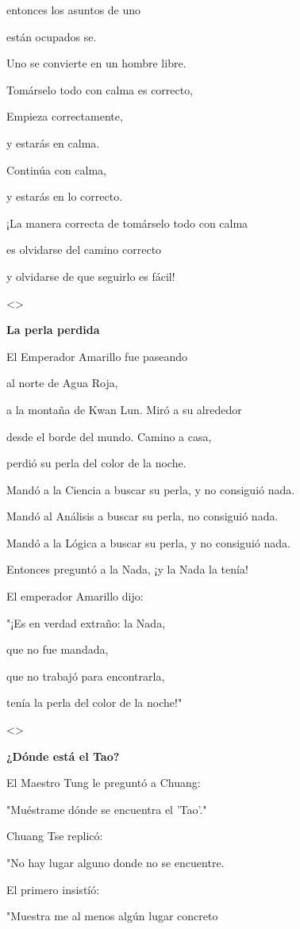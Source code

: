 entonces los asuntos de uno

están ocupados se.

Uno se convierte en un hombre libre.

Tomárselo todo con calma es correcto,

Empieza correctamente,

y estarás en calma.

Continúa con calma,

y estarás en lo correcto.

¡La manera correcta de tomárselo todo con calma

es olvidarse del camino correcto

y olvidarse de que seguirlo es fácil!

\textless\textgreater{}

\textbf{{La perla perdida}}

El Emperador Amarillo fue paseando

al norte de Agua Roja,

a la montaña de Kwan Lun. Miró a su alrededor

desde el borde del mundo. Camino a casa,

perdió su perla del color de la noche.

Mandó a la Ciencia a buscar su perla, y no consiguió nada.

Mandó al Análisis a buscar su perla, no consiguió nada.

Mandó a la Lógica a buscar su perla, y no consiguió nada.

Entonces preguntó a la Nada, ¡y la Nada la tenía!

El emperador Amarillo dijo:

"¡Es en verdad extraño: la Nada,

que no fue mandada,

que no trabajó para encontrarla,

tenía la perla del color de la noche!"

\textless\textgreater{}

\textbf{{¿Dónde está el Tao?}}

El Maestro Tung le preguntó a Chuang:

"Muéstrame dónde se encuentra el 'Tao'."

Chuang Tse replicó:

"No hay lugar alguno donde no se encuentre.

El primero insistíó:

"Muestra me al menos algún lugar concreto

